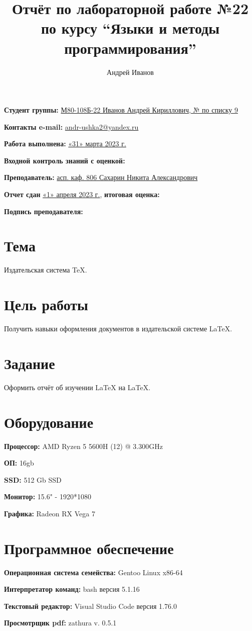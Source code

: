 \documentclass[12pt, letterpaper]{article}
\title{Отчёт по лабораторной работе №22 по курсу “Языки и методы программирования”}
\author{Андрей Иванов}
\begin{document}
\maketitle
\begin{description}
\item\textbf{Студент группы:} \underline{М80-108Б-22 Иванов Андрей Кириллович, № по списку 9 }
\item\textbf{Контакты e-mail:} \underline{andr-ushka2@yandex.ru}
\item\textbf{Работа выполнена:} \underline{«31» марта 2023 г.}
\item\textbf{Входной контроль знаний с оценкой:} 
\item\textbf{Преподаватель:} \underline{асп. каф. 806 Сахарин Никита Александрович}
\item\textbf{Отчет сдан} \underline{«1» апреля 2023 г.}, \textbf{итоговая оценка:} 
\item\textbf{Подпись преподавателя:} \underline{\hspace{3cm}}
\end{description}
\section{Тема}
Издательская система \TeX{}.
\section{Цель работы}
Получить навыки оформления документов в издательской системе \LaTeX{}.
\section{Задание}
Оформить отчёт об изучении \LaTeX{} на \LaTeX{}.
\section{Оборудование}
\begin{description}
\item\textbf{Процессор:} AMD Ryzen 5 5600H (12) @ 3.300GHz
\item\textbf{ОП:} 16gb
\item\textbf{SSD:} 512 Gb SSD
\item\textbf{Монитор:} 15.6" - 1920*1080
\item\textbf{Графика:} Radeon RX Vega 7
\end{description}
\section{Программное обеспечение}
\begin{description}
\item\textbf{Операционная система семейства:} Gentoo Linux x86-64
\item\textbf{Интерпретатор команд:} bash версия 5.1.16
\item\textbf{Текстовый редактор:} Visual Studio Code версия 1.76.0
\item\textbf{Просмотрщик pdf:} zathura v. 0.5.1
\end{description}
\end{document}
